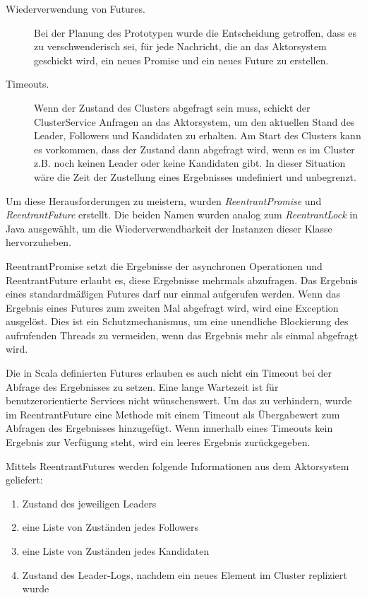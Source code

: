 \begin{description} 
	\item[Wiederverwendung von Futures.] Bei der Planung des Prototypen wurde die Entscheidung getroffen, dass es zu verschwenderisch sei, für jede Nachricht, die an das Aktorsystem geschickt wird, ein neues Promise und ein neues Future zu erstellen.
	
	\item[Timeouts.] Wenn der Zustand des Clusters abgefragt sein muss, schickt der ClusterService Anfragen an das Aktorsystem, um den aktuellen Stand des Leader, Followers und Kandidaten zu erhalten. Am Start des Clusters kann es vorkommen, dass der Zustand dann abgefragt wird, wenn es im Cluster z.B. noch keinen Leader oder keine Kandidaten gibt. In dieser Situation wäre die Zeit der Zustellung eines Ergebnisses undefiniert und unbegrenzt.
\end{description}

Um diese Herausforderungen zu meistern, wurden \textit{ReentrantPromise} und \textit{ReentrantFuture} erstellt. Die beiden Namen wurden analog zum \textit{ReentrantLock} \cite{Long10javaconcurrency} in Java ausgewählt, um die Wiederverwendbarkeit der Instanzen dieser Klasse hervorzuheben.

ReentrantPromise setzt die Ergebnisse der asynchronen Operationen und ReentrantFuture erlaubt es, diese Ergebnisse mehrmals abzufragen. Das Ergebnis eines standardmäßigen Futures darf nur einmal aufgerufen werden. Wenn das Ergebnis eines Futures zum zweiten Mal abgefragt wird, wird eine Exception ausgelöst. Dies ist ein Schutzmechanismus, um eine unendliche Blockierung des aufrufenden Threads zu vermeiden, wenn das Ergebnis mehr als einmal abgefragt wird.

Die in Scala definierten Futures erlauben es auch nicht ein Timeout bei der Abfrage des Ergebnisses zu setzen. Eine lange Wartezeit ist für benutzerorientierte Services nicht wünschenswert. Um das zu verhindern, wurde im ReentrantFuture eine Methode mit einem Timeout als Übergabewert zum Abfragen des Ergebnisses hinzugefügt. Wenn innerhalb eines Timeouts kein Ergebnis zur Verfügung steht, wird ein leeres Ergebnis zurückgegeben.

Mittels ReentrantFutures werden folgende Informationen aus dem Aktorsystem geliefert:

\begin{enumerate}
	\item Zustand des jeweiligen Leaders
	
	\item eine Liste von Zuständen jedes Followers
	
	\item eine Liste von Zuständen jedes Kandidaten
	
	\item Zustand des Leader-Logs, nachdem ein neues Element im Cluster repliziert wurde
\end{enumerate}

